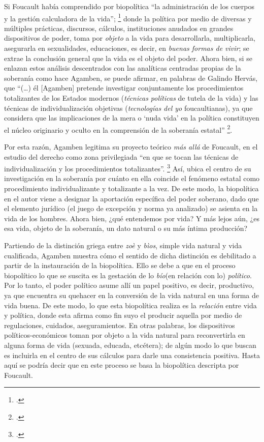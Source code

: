 Si Foucault había comprendido por biopolítica \enquote{la administración de los cuerpos y la gestión calculadora de la vida}; \footcite[169]{@7098-FOUCAULT2003} donde la política por medio de diversas y múltiples prácticas, discursos, cálculos, instituciones anudados en grandes dispositivos de poder, toma por \emph{objeto} a la vida para desarrollarla, multiplicarla, asegurarla en sexualidades, educaciones, es decir, en \emph{buenas formas de vivir}; se extrae la conclusión general que la vida es el objeto del poder. Ahora bien, si se enlazan estos análisis descentrados con las analíticas centradas propias de la soberanía como hace Agamben, se puede afirmar, en palabras de Galindo Hervás, que \enquote{(\ldots) él {[}Agamben{]} pretende investigar conjuntamente los procedimientos totalizantes de los Estados modernos (\emph{técnicas políticas} de tutela de la vida) y las técnicas de individualización objetivas (\emph{tecnologías del yo} foucaultianas), ya que considera que las implicaciones de la mera o \enquote{nuda vida} en la política constituyen el núcleo originario y oculto en la comprensión de la soberanía estatal} \footcite[94]{@7088-GALINDOHERVAS2003}.

Por esta razón, Agamben legitima su proyecto teórico \emph{más allá} de Foucault, en el estudio del derecho como zona privilegiada \enquote{en que se tocan las técnicas de individualización y los procedimientos totalizantes}. \footcite[15]{@7101-AGAMBEN2003} Así, ubica el centro de su investigación en la soberanía por cuánto en ella coincide el fenómeno estatal como procedimiento individualizante y totalizante a la vez. De este modo, la biopolítica en el autor viene a designar la aportación específica del poder soberano, dado que el elemento jurídico (el juego de excepción y norma ya analizado) se asienta en la vida de los hombres. Ahora bien, ¿qué entendemos por vida? Y más lejos aún, ¿es esa vida, objeto de la soberanía, un dato natural o su más íntima producción?

Partiendo de la distinción griega entre \emph{zoè} y \emph{bìos}, simple vida natural y vida cualificada, Agamben muestra cómo el sentido de dicha distinción es debilitado a partir de la instauración de la biopolítica. Ello se debe a que en el proceso biopolítico lo que se suscita es la gestación de lo \emph{bío}(en relación con lo) \emph{político}. Por lo tanto, el poder político asume allí un papel positivo, es decir, productivo, ya que encuentra su quehacer en la conversión de la vida natural en una forma de vida buena. De este modo, lo que esta biopolítica realiza es la \emph{relación} entre vida y política, donde esta afirma como fin suyo el producir aquella por medio de regulaciones, cuidados, aseguramientos. En otras palabras, los dispositivos políticos-económicos toman por objeto a la vida natural para reconvertirla en alguna forma de vida (sexuada, educada, etcétera); de algún modo lo que buscan es incluirla en el centro de sus cálculos para darle una consistencia positiva. Hasta aquí se podría decir que en este proceso se basa la biopolítica descripta por Foucault.

